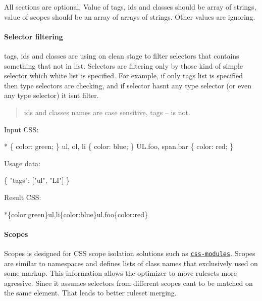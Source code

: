 All sections are optional. Value of {\ttfamily tags}, {\ttfamily ids} and {\ttfamily classes} should be array of strings, value of {\ttfamily scopes} should be an array of arrays of strings. Other values are ignoring.

\paragraph*{Selector filtering}

{\ttfamily tags}, {\ttfamily ids} and {\ttfamily classes} are using on clean stage to filter selectors that contains something that not in list. Selectors are filtering only by those kind of simple selector which white list is specified. For example, if only {\ttfamily tags} list is specified then type selectors are checking, and if selector hasn\textquotesingle{}t any type selector (or even any type selector) it isn\textquotesingle{}t filter.

\begin{quote}
{\ttfamily ids} and {\ttfamily classes} names are case sensitive, {\ttfamily tags} – is not. \end{quote}


Input C\+SS\+:


\begin{DoxyCode}
* \{ color: green; \}
ul, ol, li \{ color: blue; \}
UL.foo, span.bar \{ color: red; \}
\end{DoxyCode}


Usage data\+:


\begin{DoxyCode}
\{
    "tags": ["ul", "LI"]
\}
\end{DoxyCode}


Result C\+SS\+:


\begin{DoxyCode}
*\{color:green\}ul,li\{color:blue\}ul.foo\{color:red\}
\end{DoxyCode}


\paragraph*{Scopes}

Scopes is designed for C\+SS scope isolation solutions such as \href{https://github.com/css-modules/css-modules}{\tt css-\/modules}. Scopes are similar to namespaces and defines lists of class names that exclusively used on some markup. This information allows the optimizer to move rulesets more agressive. Since it assumes selectors from different scopes can\textquotesingle{}t to be matched on the same element. That leads to better ruleset merging.

